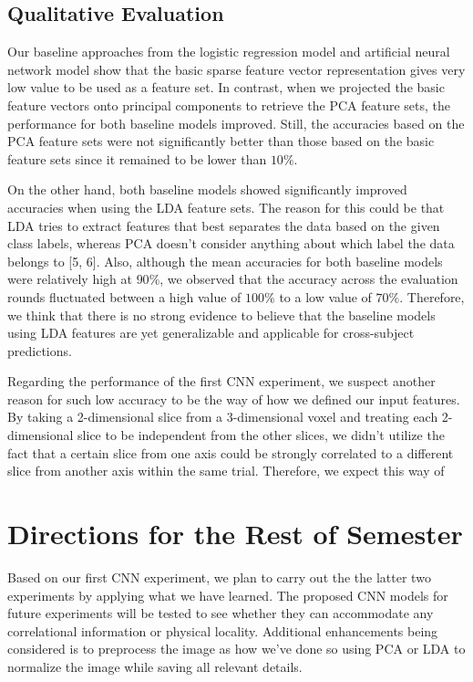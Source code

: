 \documentclass{article} %
\begin{document}
\subsection{Qualitative Evaluation}

Our baseline approaches from the logistic regression model and artificial neural network model show that the basic sparse feature vector representation gives very low value to be used as a feature set. In contrast, when we projected the basic feature vectors onto principal components to retrieve the PCA feature sets, the performance for both baseline models improved. Still, the accuracies based on the PCA feature sets were not significantly better than those based on the basic feature sets since it remained to be lower than $10\%$.

On the other hand, both baseline models showed significantly improved accuracies when using the LDA feature sets. The reason for this could be that LDA tries to extract features that best separates the data based on the given class labels, whereas PCA doesn't consider anything about which label the data belongs to [5, 6]. Also, although the mean accuracies for both baseline models were relatively high at $90\%$, we observed that the accuracy across the evaluation rounds fluctuated between a high value of $100\%$ to a low value of $70\%$. Therefore, we think that there is no strong evidence to believe that the baseline models using LDA features are yet generalizable and applicable for cross-subject predictions.

Regarding the performance of the first CNN experiment, we suspect another reason for such low accuracy to be the way of how we defined our input features. By taking a 2-dimensional slice from a 3-dimensional voxel and treating each 2-dimensional slice to be independent from the other slices, we didn't utilize the fact that a certain slice from one axis could be strongly correlated to a different slice from another axis within the same trial. Therefore, we expect this way of 

\section{Directions for the Rest of Semester}

Based on our first CNN experiment, we plan to carry out the the latter two experiments by applying what we have learned. The proposed CNN models for future experiments will be tested to see whether they can accommodate any correlational information or physical locality. Additional enhancements being considered is to preprocess the image as how we've done so using PCA or LDA to normalize the image while saving all relevant details.
\end{document}
